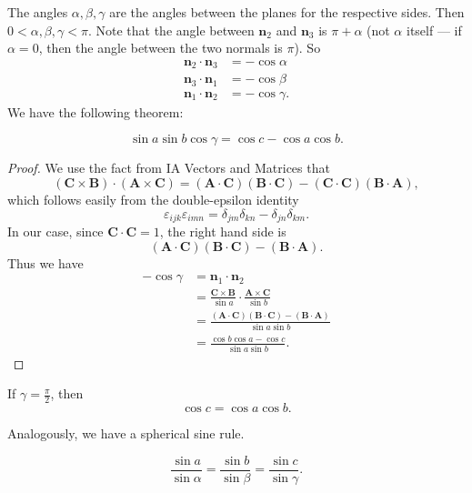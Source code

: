 \documentclass[a4paper]{article}
\begin{document}
The angles $\alpha, \beta, \gamma$ are the angles between the planes for the respective sides. Then $0 < \alpha, \beta, \gamma < \pi$. Note that the angle between $\mathbf{n}_2$ and $\mathbf{n}_3$ is $\pi + \alpha$ (not $\alpha$ itself --- if $\alpha = 0$, then the angle between the two normals is $\pi$). So
\begin{align*}
  \mathbf{n}_2 \cdot \mathbf{n}_3 &= -\cos \alpha\\
  \mathbf{n}_3 \cdot \mathbf{n}_1 &= -\cos \beta\\
  \mathbf{n}_1 \cdot \mathbf{n}_2 &= -\cos \gamma.
\end{align*}
We have the following theorem:
\begin{thm}
  \[
    \sin a \sin b \cos \gamma = \cos c - \cos a \cos b.
  \]
\end{thm}

\begin{proof}
  We use the fact from IA Vectors and Matrices that
  \[
    (\mathbf{C}\times \mathbf{B}) \cdot (\mathbf{A} \times \mathbf{C}) = (\mathbf{A}\cdot \mathbf{C})(\mathbf{B}\cdot \mathbf{C}) - (\mathbf{C} \cdot \mathbf{C})(\mathbf{B}\cdot \mathbf{A}),
  \]
  which follows easily from the double-epsilon identity
  \[
    \varepsilon_{ijk}\varepsilon_{imn} = \delta_{jm}\delta_{kn} - \delta_{jn}\delta_{km}.
  \]
  In our case, since $\mathbf{C}\cdot \mathbf{C} = 1$, the right hand side is
  \[
    (\mathbf{A}\cdot \mathbf{C}) (\mathbf{B}\cdot \mathbf{C}) - (\mathbf{B}\cdot \mathbf{A}).
  \]
  Thus we have
  \begin{align*}
    -\cos \gamma &= \mathbf{n}_1 \cdot \mathbf{n}_2\\
    &= \frac{\mathbf{C}\times \mathbf{B}}{\sin a} \cdot \frac{\mathbf{A}\times \mathbf{C}}{\sin b} \\
    &= \frac{(\mathbf{A}\cdot \mathbf{C})(\mathbf{B}\cdot \mathbf{C}) - (\mathbf{B}\cdot \mathbf{A})}{\sin a \sin b}\\
    &= \frac{\cos b\cos a - \cos c}{\sin a \sin b}.
  \end{align*}
\end{proof}

\begin{cor}
  If $\gamma = \frac{\pi}{2}$, then
  \[
    \cos c = \cos a \cos b.
  \]
\end{cor}

Analogously, we have a spherical sine rule.
\begin{thm}
  \[
    \frac{\sin a}{\sin \alpha} = \frac{\sin b}{\sin \beta} = \frac{\sin c}{\sin \gamma}.
  \]
\end{thm}
\end{document}
